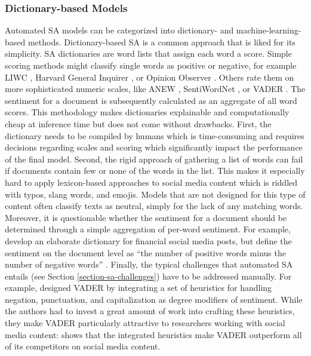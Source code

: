 \subsubsection{Dictionary-based Models}
Automated SA models can be categorized into dictionary- and machine-learning-based methods. Dictionary-based SA is a common approach that is liked for its simplicity. SA dictionaries are word lists that assign each word a score. Simple scoring methods might classify single words as positive or negative, for example LIWC , Harvard General Inquirer , or Opinion Observer . Others rate them on more sophisticated numeric scales, like ANEW , SentiWordNet , or VADER . The sentiment for a document is subsequently calculated as an aggregate of all word scores. This methodology makes dictionaries explainable and computationally cheap at inference time but does not come without drawbacks. First, the dictionary needs to be compiled by humans which is time-consuming and requires decisions regarding scales and scoring which significantly impact the performance of the final model. Second, the rigid approach of gathering a list of words can fail if documents contain few or none of the words in the list. This makes it especially hard to apply lexicon-based approaches to social media content which is riddled with typos, slang words, and emojis. Models that are not designed for this type of content often classify texts as neutral, simply for the lack of any matching words. Moreover, it is questionable whether the sentiment for a document should be determined through a simple aggregation of per-word sentiment. For example,  develop an elaborate dictionary for financial social media posts, but define the sentiment on the document level as ``the number of positive words minus the number of negative words'' \cite[p.~42]{chen2018ntusd}. Finally, the typical challenges that automated SA entails (see Section \ref{section-sa-challenges}) have to be addressed manually. For example,  designed VADER by integrating a set of heuristics for handling negation, punctuation, and capitalization as degree modifiers of sentiment. While the authors had to invest a great amount of work into crafting these heuristics, they make VADER particularly attractive to researchers working with social media content:  shows that the integrated heuristics make VADER outperform all of its competitors on social media content.

